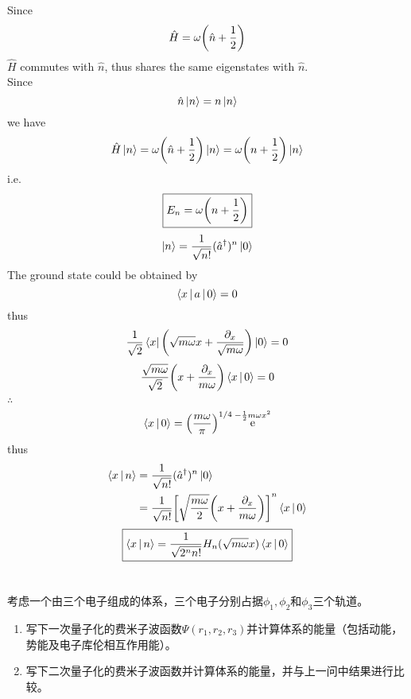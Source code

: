 \documentclass[a4paper]{article}
\DeclareMathOperator{\e}{\mathrm{e}}
\numberwithin{equation}{section}
\begin{document}
Since 
\begin{equation}\label{key}
	\hat H = \omega \qty(\hat n + \dfrac{1}{2})
\end{equation}
$ \hat H $ commutes with $ \hat n $, thus shares the same eigenstates with $ \hat n $.\\ 
Since 
\begin{equation}\label{key}
	\hat n \ket{n} = n \ket{n}
\end{equation}
we have
\begin{equation}\label{key}
	\hat H \ket{n} = \omega \qty(\hat n + \dfrac{1}{2}) \ket{n} = \omega \qty(n + \dfrac{1}{2}) \ket{n}
\end{equation}
i.e.
\begin{equation}\label{key}
	\boxed{E_n = \omega \qty(n + \dfrac{1}{2}) }
\end{equation}
\begin{align}
	\ket{n} = \dfrac{1}{\sqrt{n!}} (\hat a^\dagger)^n \ket{0}
\end{align}
The ground state could be obtained by
\begin{equation}\label{key}
	\Braket{x | a | 0} = 0
\end{equation}
thus
\begin{align}
	\dfrac{1}{\sqrt{2}} \Bra{x}\qty(\sqrt{m\omega} x + \dfrac{\partial_x}{\sqrt{m\omega}}) \Ket{ 0} = 0
\end{align}
\begin{equation}\label{key}
	\dfrac{\sqrt{m\omega}}{\sqrt{2}} \qty( x + \dfrac{\partial_x}{m\omega}) \Braket{x| 0} = 0
\end{equation}
$ \therefore $
\begin{equation}\label{key}
	\Braket{x|0} = \qty(\dfrac{m\omega}{\pi})^{1/4} \e^{-\frac{1}{2}m\omega x^2}
\end{equation}
thus
\begin{align}
	\Braket{x|n} &= \dfrac{1}{\sqrt{n!}} (\hat a^\dagger)^n \ket{0} \notag\\
	&= \dfrac{1}{\sqrt{n!}} \qty[\sqrt{\dfrac{m\omega}{2}} \qty(x + \dfrac{\partial_x}{m\omega})]^n \Braket{x|0}
\end{align}
\begin{equation}\label{key}
	\boxed{	\Braket{x|n} = \dfrac{1}{\sqrt{2^n n!}} H_n(\sqrt{m\omega}x) \Braket{x|0}
	}
\end{equation}
\section{}
考虑一个由三个电子组成的体系，三个电子分别占据$ \phi_1, \phi_2 $和$ \phi_3 $三个轨道。
\begin{enumerate}
	\item 写下一次量子化的费米子波函数$ \Psi(r_1,r_2,r_3) $并计算体系的能量（包括动能，势能及电子库伦相互作用能）。
	\item 写下二次量子化的费米子波函数并计算体系的能量，并与上一问中结果进行比较。
\end{enumerate}
\end{document}
